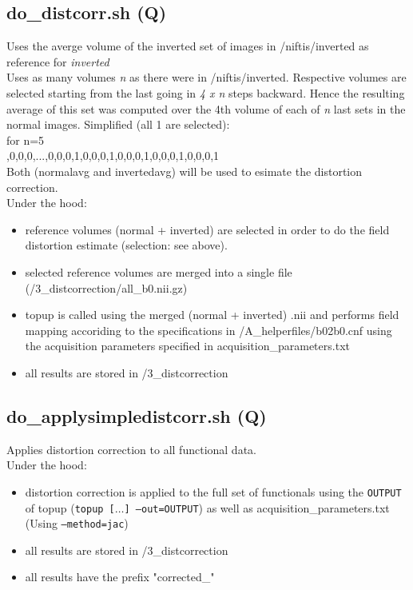 \documentclass[12pt,a4paper]{scrartcl}
\begin{document}
\subsection{do\_distcorr.sh (Q)}
\label{sec:distcorr}
Uses the averge volume of the inverted set of images in /niftis/inverted as reference for \textit{inverted}\\

\noindent Uses as many volumes \textit{n} as there were in /niftis/inverted. Respective volumes are selected starting from the last going in \textit{4 x n} steps backward. Hence the resulting average of this set was computed over the 4th volume of each of \textit{n} last sets in the normal images. Simplified (all 1 are selected):\\

\noindent for n=5\\

,0,0,0,...,0,0,0,1,0,0,0,1,0,0,0,1,0,0,0,1,0,0,0,1\\

\noindent Both (normalavg and invertedavg) will be used to esimate the distortion correction.\\

\noindent Under the hood:
\begin{itemize}
\item reference volumes (normal + inverted) are selected in order to do the field distortion estimate (selection: see above).
\item selected reference volumes are merged into a single file (/3\_distcorrection/all\_b0.nii.gz)
\item topup is called using the merged (normal + inverted) .nii and performs field mapping accoriding to the specifications in /A\_helperfiles/b02b0.cnf using the acquisition parameters specified in acquisition\_parameters.txt
\item all results are stored in /3\_distcorrection
\end{itemize}

\subsection{do\_applysimpledistcorr.sh (Q)}
\label{sec:applydistcorr}
Applies distortion correction to all functional data.\\

\noindent Under the hood:
\begin{itemize}
\item distortion correction is applied to the full set of functionals using the \texttt{OUTPUT} of topup (\texttt{topup [$\ldots$] --out=OUTPUT}) as well as acquisition\_parameters.txt (Using \texttt{--method=jac})
\item all results are stored in /3\_distcorrection
\item all results have the prefix "corrected\_"
\end{itemize}
\end{document}

